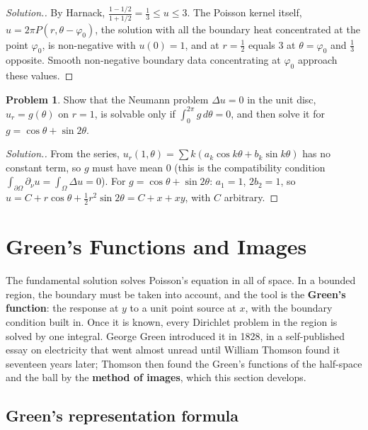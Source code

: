 \documentclass[11pt,a4paper]{article}
\numberwithin{equation}{section}
\theoremstyle{definition}
\newtheorem{problemx}{Problem}[subsection]
\newenvironment{problem}{\begin{problemx}}{\end{problemx}}
\newenvironment{solution}
  {\renewcommand{\qedsymbol}{}\begin{proof}[\textit{Solution}.]}
  {\end{proof}}
\begin{document}
\begin{solution}
By Harnack, $\frac{1 - 1/2}{1 + 1/2} = \frac13 \leq u \leq 3$. The Poisson kernel itself, $u = 2\pi P(r, \theta - \varphi_0)$, the solution with all the boundary heat concentrated at the point $\varphi_0$, is non-negative with $u(0) = 1$, and at $r = \frac12$ equals $3$ at $\theta = \varphi_0$ and $\frac13$ opposite.
Smooth non-negative boundary data concentrating at $\varphi_0$ approach these values.
\end{solution}

\begin{problem}
Show that the Neumann problem $\Delta u = 0$ in the unit disc, $u_r = g(\theta)$ on $r = 1$, is solvable only if $\int_0^{2\pi}g\,d\theta = 0$, and then solve it for $g = \cos\theta + \sin 2\theta$.
\end{problem}

\begin{solution}
From the series, $u_r(1, \theta) = \sum k(a_k\cos k\theta + b_k\sin k\theta)$ has no constant term, so $g$ must have mean $0$ (this is the compatibility condition $\int_{\partial\Omega}\partial_\nu u = \int_\Omega\Delta u = 0$). For $g = \cos\theta + \sin 2\theta$: $a_1 = 1$, $2b_2 = 1$, so $u = C + r\cos\theta + \frac12r^2\sin 2\theta = C + x + xy$, with $C$ arbitrary.
\end{solution}

\section{Green's Functions and Images}
\label{sec:green}

The fundamental solution solves Poisson's equation in all of space. In a bounded region, the boundary must be taken into account, and the tool is the \textbf{Green's function}: the response at $y$ to a unit point source at $x$, with the boundary condition built in. Once it is known, every Dirichlet
problem in the region is solved by one integral. George Green introduced it in 1828, in a self-published essay on electricity that went almost unread until William Thomson found it seventeen years later; Thomson then found the Green's functions of the half-space and the ball by the
\textbf{method of images}, which this section develops.

\subsection{Green's representation formula}
\label{ssec:representation}
\end{document}
